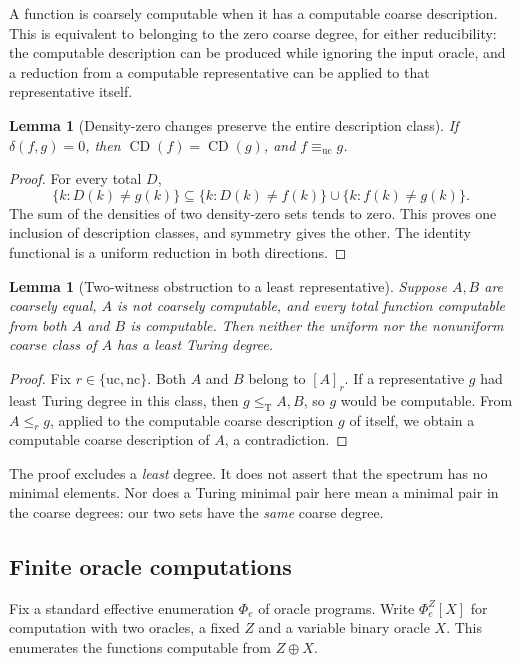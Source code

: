 \documentclass[11pt,a4paper]{article}
\newcommand{\leT}{\leq_{\mathrm T}}
\newcommand{\CD}{\operatorname{CD}}
\newcommand{\nc}{\mathrm{nc}}
\newcommand{\uc}{\mathrm{uc}}
\newcommand{\phiZ}[2]{\Phi_{#1}^{Z}[#2]}
\newtheorem{lemma}[theorem]{Lemma}
\theoremstyle{definition}\newtheorem{definition}[theorem]{Definition}
\theoremstyle{remark}\newtheorem{remark}[theorem]{Remark}
\begin{document}
A function is coarsely computable when it has a computable coarse description. This is equivalent to belonging to the zero coarse degree, for either reducibility: the computable description can be produced while ignoring the input oracle, and a reduction from a computable representative can be applied to that representative itself.

\begin{lemma}[Density-zero changes preserve the entire description class]
\label{lem:equal-CD}
If $\delta(f,g)=0$, then $\CD(f)=\CD(g)$, and $f\equiv_\uc g$.
\end{lemma}
\begin{proof}
For every total $D$,
\[
 \{k:D(k)\ne g(k)\}
 \subseteq \{k:D(k)\ne f(k)\}\cup\{k:f(k)\ne g(k)\}.
\]
The sum of the densities of two density-zero sets tends to zero. This proves one inclusion of description classes, and symmetry gives the other. The identity functional is a uniform reduction in both directions.
\end{proof}

\begin{lemma}[Two-witness obstruction to a least representative]
\label{lem:no-least}
Suppose $A,B$ are coarsely equal, $A$ is not coarsely computable, and every total function computable from both $A$ and $B$ is computable. Then neither the uniform nor the nonuniform coarse class of $A$ has a least Turing degree.
\end{lemma}
\begin{proof}
Fix $r\in\{\uc,\nc\}$. Both $A$ and $B$ belong to $[A]_r$. If a representative $g$ had least Turing degree in this class, then $g\leT A,B$, so $g$ would be computable. From $A\le_r g$, applied to the computable coarse description $g$ of itself, we obtain a computable coarse description of $A$, a contradiction.
\end{proof}

The proof excludes a \emph{least} degree. It does not assert that the spectrum has no minimal elements. Nor does a Turing minimal pair here mean a minimal pair in the coarse degrees: our two sets have the \emph{same} coarse degree.

\subsection{Finite oracle computations}
Fix a standard effective enumeration $\Phi_e$ of oracle programs. Write $\phiZ{e}{X}$ for computation with two oracles, a fixed $Z$ and a variable binary oracle $X$. This enumerates the functions computable from $Z\oplus X$.
\end{document}
